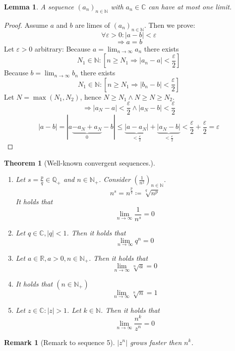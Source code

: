 \documentclass[a4paper,landscape,twocolumn]{article}
\newtheorem{theorem}{Theorem}
\newtheorem{rem}{Remark}
\newtheorem{lemma}{Lemma}
\newcommand\abs[1]{\left|#1\right|}
\begin{document}
\begin{lemma}
  A sequence $(a_n)_{n \in \mathbb N}$ with $a_n \in \mathbb C$ can have at most one limit.
\end{lemma}
\begin{proof}
  Assume $a$ and $b$ are limes of $(a_n)_{n \in \mathbb N}$. Then we prove:
  \[ \forall \varepsilon > 0: \abs{a - b} < \varepsilon \]
  \[ \Rightarrow a = b \]
  Let $\varepsilon > 0$ arbitrary:
  Because $a = \lim_{n \to \infty} a_n$ there exists
  \[ N_1 \in \mathbb N: \left[n \geq N_1 \Rightarrow \abs{a_n - a} < \frac{\varepsilon}2\right] \]
  Because $b = \lim_{n \to \infty} b_n$ there exists
  \[ N_1 \in \mathbb N: \left[n \geq N_1 \Rightarrow \abs{b_n - b} < \frac{\varepsilon}2\right] \]
  Let $N = \max(N_1, N_2)$, hence $N \geq N_1 \land N \geq N \geq N_2$.
  \[ \Rightarrow \abs{a_N - a} < \frac{\varepsilon}{2} \land \abs{a_N - b} < \frac{\varepsilon}{2} \]
  \[ \abs{a - b} = |a \underbrace{- a_N + a_N}_0 - b| \leq \underbrace{\abs{a - a_N}}_{< \frac{\varepsilon}2} + \underbrace{\abs{a_N - b}}_{< \frac{\varepsilon}2} < \frac{\varepsilon}{2} + \frac{\varepsilon}{2} = \varepsilon \]
\end{proof}

\begin{theorem}[Well-known convergent sequences.] \hfill{}
  \begin{enumerate}
    \item
      Let $s = \frac pq \in \mathbb Q_+$ and $n \in \mathbb N_+$. Consider $\left(\frac 1{n^2}\right)_{n \in \mathbb N}$.
      \[ n^s = n^{\frac pq} \coloneqq \sqrt[q]{n^p} \]
      It holds that
      \[ \lim_{n \to \infty} \frac{1}{n^s} = 0 \]
    \item Let $q \in \mathbb C, \abs{q} < 1$. Then it holds that
      \[ \lim_{n \to \infty} q^n = 0 \]
    \item Let $a \in \mathbb R, a > 0, n \in \mathbb N_+$. Then it holds that
      \[ \lim_{n \to \infty} \sqrt[n]{a} = 0 \]
    \item It holds that $(n \in \mathbb N_+)$
      \[ \lim_{n \to \infty} \sqrt[n]{n} = 1 \]
    \item Let $z \in \mathbb C: \abs{z} > 1$. Let $k \in \mathbb N$.
      Then it holds that \[ \lim_{n \to \infty} \frac{n^k}{z^n} = 0 \]
  \end{enumerate}
\end{theorem}

\begin{rem}[Remark to sequence 5]
  $\abs{z^n}$ grows faster then $n^k$.
\end{rem}
\end{document}
